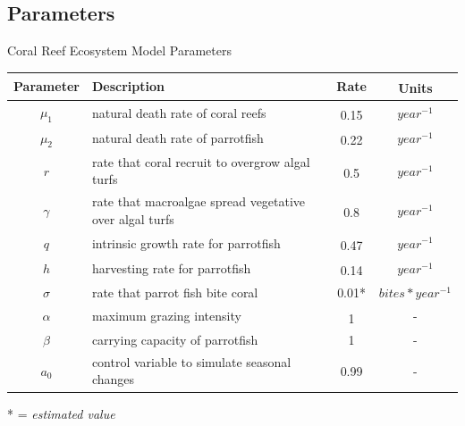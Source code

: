 \documentclass{beamer}
\begin{document}
\subsection{Parameters}
\begin{frame}{Coral Reef Ecosystem Model Parameters}
    \begin{table}
    \centering
    \vspace{-.7cm}
    \begin{tabular}{c p{5cm} c c}
        \hline
        Parameter & Description & Rate & Units\textsuperscript{\cite{12_noaa_report}\cite{04_mathanalysis}\cite{13_blackwood_hastings_mumby_2010}}\\
        \hline
        \hline
        $\mu_{1}$ & natural death rate of coral reefs & 0.15\textsuperscript{\cite{16_wolanski_richmond_mccook_2004}} & $year^{-1}$\\ %
        $\mu_{2}$ & natural death rate of parrotfish & 0.22\textsuperscript{\cite{12_noaa_report}} & $year^{-1}$\\ %
        $r$ & rate that coral recruit to overgrow algal turfs & 0.5\textsuperscript{\cite{16_wolanski_richmond_mccook_2004}} & $year^{-1}$\\ %
        $\gamma$ & rate that macroalgae spread vegetative over algal turfs & 0.8\textsuperscript{\cite{11_zikkah_anggriani_supriatna_2020}} & $year^{-1}$\\ %
        $q$ & intrinsic growth rate for parrotfish & 0.47\textsuperscript{\cite{12_noaa_report}} & $year^{-1}$\\ %
        $h$ & harvesting rate for parrotfish & 0.14\textsuperscript{\cite{12_noaa_report}} & $year^{-1}$\\ %
        $\sigma$ & rate that parrot fish bite coral & 0.01*& $bites*year^{-1}$\\
        $\alpha$ & maximum grazing intensity & 1\textsuperscript{\cite{13_blackwood_hastings_mumby_2010}} & -\\
        $\beta$ & carrying capacity of parrotfish & 1 & -\\
        $a_{0}$ & control variable to simulate seasonal changes & 0.99 & -\\ %
    \end{tabular}
\end{table}
 * = \textit{estimated value}
\end{frame}
\end{document}
